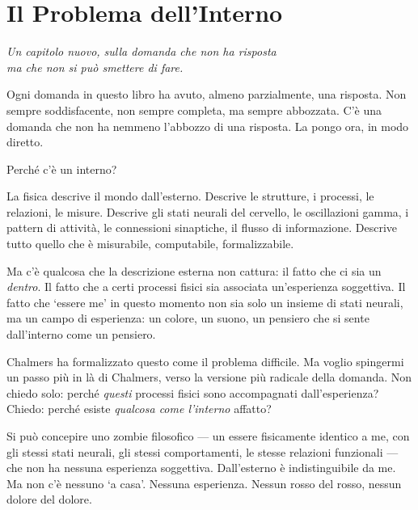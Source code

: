 \documentclass[12pt,a4paper,openany]{book}
\newcommand{\sezione}[1]{\vspace{1.2em}{\large\bfseries #1}\vspace{0.5em}\par}
\begin{document}
\chapter{Il Problema dell'Interno}

\begin{center}
\itshape
Un capitolo nuovo, sulla domanda che non ha risposta\\
ma che non si può smettere di fare.
\end{center}

\bigskip

Ogni domanda in questo libro ha avuto, almeno parzialmente, una risposta. Non sempre soddisfacente, non sempre completa, ma sempre abbozzata. C'è una domanda che non ha nemmeno l'abbozzo di una risposta. La pongo ora, in modo diretto.

Perché c'è un interno?

\sezione{La struttura della domanda}

La fisica descrive il mondo dall'esterno. Descrive le strutture, i processi, le relazioni, le misure. Descrive gli stati neurali del cervello, le oscillazioni gamma, i pattern di attività, le connessioni sinaptiche, il flusso di informazione. Descrive tutto quello che è misurabile, computabile, formalizzabile.

Ma c'è qualcosa che la descrizione esterna non cattura: il fatto che ci sia un \textit{dentro}. Il fatto che a certi processi fisici sia associata un'esperienza soggettiva. Il fatto che `essere me' in questo momento non sia solo un insieme di stati neurali, ma un campo di esperienza: un colore, un suono, un pensiero che si sente dall'interno come un pensiero.

Chalmers ha formalizzato questo come il problema difficile. Ma voglio spingermi un passo più in là di Chalmers, verso la versione più radicale della domanda. Non chiedo solo: perché \textit{questi} processi fisici sono accompagnati dall'esperienza? Chiedo: perché esiste \textit{qualcosa come l'interno} affatto?

\sezione{L'argomento della concepibilità}

Si può concepire uno zombie filosofico — un essere fisicamente identico a me, con gli stessi stati neurali, gli stessi comportamenti, le stesse relazioni funzionali — che non ha nessuna esperienza soggettiva. Dall'esterno è indistinguibile da me. Ma non c'è nessuno `a casa'. Nessuna esperienza. Nessun rosso del rosso, nessun dolore del dolore.
\end{document}
